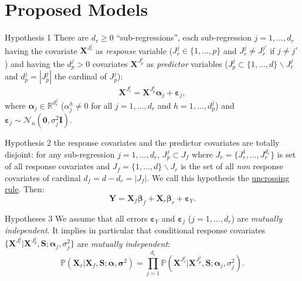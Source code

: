 \documentclass[11pt]{beamer}
\begin{document}
\section{Proposed Models}
	\begin{frame}{Hypothesis 1}
	There are $d_{r}\geq 0$ ``sub-regressions'', each sub-regression $j=1,\ldots,d_{r}$ having the covariate $\boldsymbol{X}^{J_{r}^j}$ as {\it response} variable ($J_{r}^j\in\{1,\ldots,p\}$ and $J_{r}^j\neq J_{r}^{j'}$ if $j\neq j'$) and having the $d_p^j>0$ covariates $\boldsymbol{X}^{J_{p}^j}$  as {\it predictor} variables ($J_{p}^j\subset\{1,\ldots,d\} \backslash J_{r}^j$ and $d_p^j=|J_{p}^j|$ the cardinal of $J_{p}^j$):
\begin{equation}
\boldsymbol{X}^{J_{r}^j}%
=\boldsymbol{X}^{J_{p}^j}\boldsymbol{\alpha}_j+\boldsymbol{\varepsilon}_j, \label{eq:SR}
\end{equation}
where $\boldsymbol{\alpha}_j\in{\mathbb{R}^{d_r^j}}$ (${\alpha}_j^h\neq 0$ for all $j=1,\ldots,d_r$ and $h=1,\ldots,d_p^j$) and $\boldsymbol{\varepsilon}_j \sim\mathcal{N}_n(\boldsymbol{0},\sigma^2_j\boldsymbol{I})$.
	\end{frame}
	\begin{frame}{Hypothesis 2}
	the response covariates and the predictor covariates are totally disjoint: for any sub-regression $j=1,\ldots,d_{r}$, $J_{p}^j\subset J_f$ where $J_{r}=\{J_{r}^1,\ldots,J_{r}^{d_r}\}$ is set of all response covariates and $J_f=\{1,\ldots,d\} \backslash J_{r}$ is the set of all {\it non} response covariates of cardinal $d_f=d-d_r=|J_f|$. We call this hypothesis the \underline{uncrossing rule}. Then:
	\begin{equation}
			\boldsymbol{Y} %
			=\boldsymbol{X}_f\boldsymbol{\beta}_f+\boldsymbol{X}_r\boldsymbol{\beta}_r+\boldsymbol{\varepsilon}_Y. \label{eq:MainR}
\end{equation}
	\end{frame}
	\begin{frame}{Hypotheses 3}
	We assume that all errors $\boldsymbol{\varepsilon}_Y$ and $\boldsymbol{\varepsilon}_j$ ($j=1,\ldots,d_r$) are {\it mutually independent}. It implies in particular that conditional response covariates $\{\boldsymbol{X}^{J_{r}^j}|\boldsymbol{X}^{J_{p}^j},\boldsymbol{S};\boldsymbol{\alpha}_j,\sigma^2_j\}$ are {\it mutually independent}:
\begin{equation}\label{eq:H3}
\mathbb{P}(\boldsymbol{X}_r | \boldsymbol{X}_f,\boldsymbol{S};\boldsymbol{\alpha},\boldsymbol{\sigma}^2) = \prod_{j=1}^{d_r} \mathbb{P}(\boldsymbol{X}^{J_{r}^j}|\boldsymbol{X}^{J_{p}^j},\boldsymbol{S};\boldsymbol{\alpha}_j,\sigma^2_j). 
\end{equation}
	\end{frame}
\end{document}
